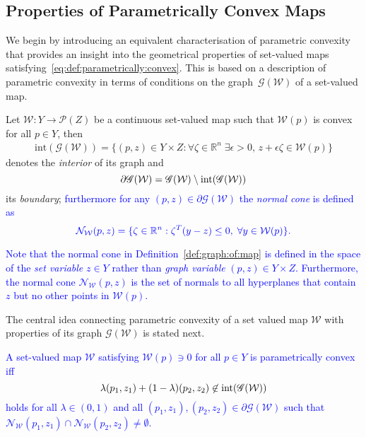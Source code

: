 \documentclass[smallextended]{svjour3}       %
\numberwithin{equation}{section}
\newcommand{\revision}[1]{\textcolor{blue}{#1}}
\begin{document}
\subsection{Properties of Parametrically Convex Maps}\label{ssec:properties:of:p:convex:maps}
%
We begin by introducing an equivalent characterisation of parametric convexity that provides an insight into the geometrical properties of 
set-valued maps satisfying~\eqref{eq:def:parametrically:convex}.
%
This is based on a description of parametric convexity in terms of conditions on the graph~$\mathscr G(\mathcal W)$ of a set-valued map.
%
\begin{definition}\label{def:graph:of:map}
Let $\mathcal W:Y\rightarrow \mathscr P(Z)$ be a continuous set-valued map
such that $\mathcal W(p)$ is convex for all $p\in Y$, then 
%
\begin{equation*}\begin{aligned}
\text{int}(\mathscr G(\mathcal W)) = \{(p,z) \in Y\times Z : \forall \zeta\in\mathbb R^n\;\exists \epsilon>0, \, z+\epsilon \zeta\in \mathcal W(p) \}
\end{aligned}\end{equation*}
%
denotes the \emph{interior} of its graph and
%
\[
  \partial \mathscr G(\mathcal W) = \mathscr G(\mathcal W)\setminus \textup{int}(\mathscr G(\mathcal W))
\]
%
its \emph{boundary};
%
\revision{furthermore for any $(p,z)\in\partial\mathscr G(\mathcal W)$ the \emph{normal cone} is defined as}
%
\[
  \revision{\mathcal N_{\mathcal W} (p,z) = \{\zeta \in\mathbb R^n: \zeta^T (y - z) \leq 0, \;  \forall y\in \mathcal W(p) \} .}
\]
%
\end{definition}
%
\begin{remark}
%
\revision{Note that the normal cone in Definition~\ref{def:graph:of:map} is defined in the space of the \emph{set variable} $z\in Y$ rather than \emph{graph variable} $(p,z)\in Y\times Z$.
%
Furthermore, the normal cone $\mathcal N_{\mathcal W} (p,z)$ is the set of normals to all hyperplanes that contain $z$ but no other points in $\mathcal W(p)$.}
%
\end{remark}
%
The central idea connecting parametric convexity of a set valued map $\mathcal W$ with properties of its graph $\mathscr G(\mathcal W)$ is stated next.
%
\begin{theorem}\label{thm:p:convexity:graph}
  \revision{A set-valued map $\mathcal W$ satisfying $\mathcal W(p)\ni 0$ for all $p\in Y$
  is parametrically convex iff
%
\begin{equation}\label{eq:graph:def:p:convexity}
\lambda (p_1,z_1) + (1-\lambda) (p_2,z_2) \not\in\textup{int} (\mathscr G(\mathcal W))
\end{equation}
%
holds for all $\lambda\in(0,1)$ and all $(p_1,z_1), (p_2,z_2)\in\partial\mathscr G(\mathcal W)$ such that  $\mathcal N_{\mathcal W}(p_1,z_1)\cap\mathcal N_{\mathcal W}(p_2,z_2)\neq\emptyset$.}
%
\end{theorem}
\end{document}
